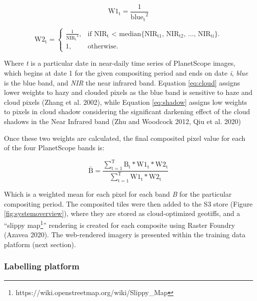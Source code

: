\documentclass[11pt,a4paper]{article}
\begin{document}
\begin{equation} \label{eq:cloud}
\mathrm{W1_t} = \frac{1}{\mathrm{blue_t}^2}
\end{equation}

\begin{equation} \label{eq:shadow}  
\mathrm{W2_t} =\begin{cases}
    \frac{1}{\mathrm{NIR_t}^4}, & \text{if $\mathrm{NIR_t}$ < median\{$\mathrm{NIR_{t1}}$, $\mathrm{NIR_{t2}}$, ..., $\mathrm{NIR_{ti}}$\}}.\\
    1, & \text{otherwise}.
  \end{cases}
\end{equation}

Where \emph{t} is a particular date in near-daily time series of
PlanetScope images, which begins at date 1 for the given compositing
period and ends on date \emph{i}, \emph{blue} is the blue band, and
\emph{NIR} the near infrared band. Equation \ref{eq:cloud} assigns lower
weights to hazy and clouded pixels as the blue band is sensitive to haze
and cloud pixels (Zhang et al. 2002), while Equation \ref{eq:shadow}
assigns low weights to pixels in cloud shadow considering the
significant darkening effect of the cloud shadows in the Near Infrared
band (Zhu and Woodcock 2012, Qiu et al. 2020)

Once these two weights are calculated, the final composited pixel value
for each of the four PlanetScope bands is:

\begin{equation}
\mathrm{\bar{B} = \frac{\sum_{t=1}^{T}B_t * W1_t * W2_t}{\sum_{t=1}^{T}W1_t * W2_t}}
\end{equation}

Which is a weighted mean for each pixel for each band \emph{B} for the
particular compositing period. The composited tiles were then added to
the S3 store (Figure \ref{fig:systemoverview}), where they are stored as
cloud-optimized geotiffs, and a ``slippy
map\footnote{https://wiki.openstreetmap.org/wiki/Slippy\_Map}''
rendering is created for each composite using Raster Foundry (Azavea
2020). The web-rendered imagery is presented within the training data
platform (next section).

\hypertarget{labelling-platform}{%
\subsubsection{Labelling platform}\label{labelling-platform}}
\end{document}
